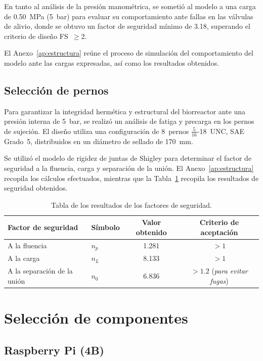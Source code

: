 En tanto al análisis de la presión manométrica, se sometió al modelo a una carga de 0.50~MPa (5~bar) para evaluar su comportamiento ante fallas en las válvulas de alivio, donde se obtuvo un factor de seguridad mínimo de 3.18, superando el criterio de diseño FS~$\geq 2$.

El Anexo~\ref{ap:estructura} reúne el proceso de simulación del comportamiento del modelo ante las cargas expresadas, así como los resultados obtenidos.

\subsection{Selección de pernos}

Para garantizar la integridad hermética y estructural del biorreactor ante una presión interna de 5~bar, se realizó un análisis de fatiga y precarga en los pernos de sujeción. El diseño utiliza una configuración de 8~pernos $\tfrac{5}{16}$-18~UNC, SAE Grado~5, distribuidos en un diámetro de sellado de 170~mm.

Se utilizó el modelo de rigidez de juntas de Shigley para determinar el factor de seguridad a la fluencia, carga y separación de la unión. El Anexo~\ref{ap:estructura} recopila los cálculos efectuados, mientras que la Tabla~\ref{tab:factores_seguridad} recopila los resultados de seguridad obtenidos.

\begin{table}[H]
\centering
\caption{Tabla de los resultados de los factores de seguridad.}
\label{tab:factores_seguridad}
\renewcommand{\arraystretch}{1.3}
\small
\begin{tabular}{llcc}
\toprule
\textbf{Factor de seguridad} & \textbf{Símbolo} & \textbf{Valor obtenido} & \textbf{Criterio de aceptación} \\
\midrule
A la fluencia                & $n_p$ & 1.281 & $> 1$ \\
A la carga                   & $n_L$ & 8.133 & $> 1$ \\
A la separación de la unión  & $n_0$ & 6.836 & $> 1.2$ (\textit{para evitar fugas}) \\
\bottomrule
\end{tabular}
\end{table}

\section{Selección de componentes}

\subsection{Raspberry Pi (4B)}

